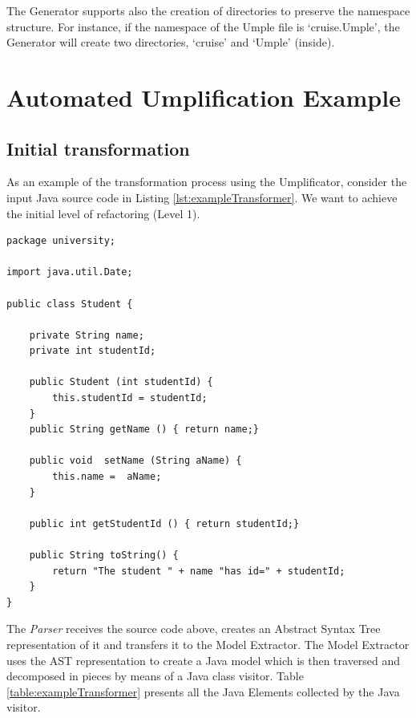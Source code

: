 The Generator supports also the creation of directories to preserve the namespace structure. For instance, if the namespace of the Umple file is `cruise.Umple', the Generator will create two directories, `cruise' and `Umple' (inside).

\section{Automated Umplification Example}
\label{sec:automatedUmplification}
\subsection{Initial transformation}

As an example of the transformation process using the Umplificator, consider the input Java source code in Listing \ref{lst:exampleTransformer}.
We want to achieve the initial level of refactoring (Level 1).

\begin{lstlisting}[style=java, caption=Input source code, label=lst:exampleTransformer]
package university;

import java.util.Date;

public class Student {
	
    private String name;
    private int studentId;
    
    public Student (int studentId) {
    	this.studentId = studentId;
    }
    public String getName () { return name;}
    
    public void  setName (String aName) { 
    	this.name =  aName;
    }
   
    public int getStudentId () { return studentId;}
    
    public String toString() {
    	return "The student " + name "has id=" + studentId;
    }
}   
\end{lstlisting}

The \textit{Parser} receives the source code above, creates an Abstract Syntax Tree representation of it and transfers it to the Model Extractor. The Model Extractor uses the AST representation to create a Java model which is then traversed and decomposed in pieces by means of a Java class visitor. Table \ref{table:exampleTransformer} presents all the Java Elements collected by the Java visitor.

